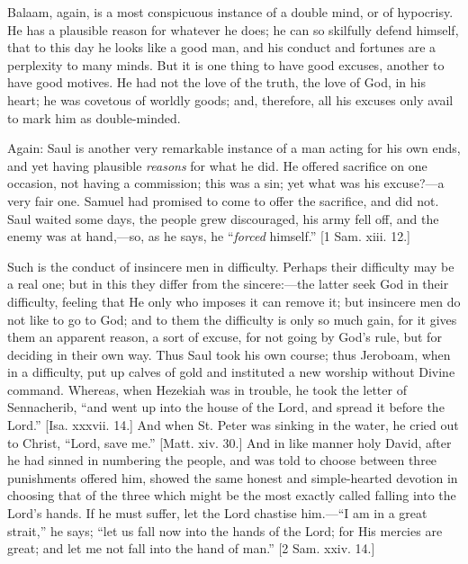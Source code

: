 Balaam, again, is a most conspicuous instance of a double mind, or
of hypocrisy. He has a plausible reason for whatever he does; he can
so skilfully defend himself, that to this day he looks like a good
man, and his conduct and fortunes are a perplexity to many minds. But
it is one thing to have good excuses, another to have good motives. He
had not the love of the truth, the love of God, in his heart; he was
covetous of worldly goods; and, therefore, all his excuses only avail
to mark him as double-minded.

Again: Saul is another very remarkable instance of a man acting for
his own ends, and yet having plausible \emph{reasons} for what he did.
He offered sacrifice on one occasion, not having a commission; this
was a sin; yet what was his excuse?—a very fair one. Samuel had
promised to come to offer the sacrifice, and did not. Saul waited some
days, the people grew discouraged, his army fell off, and the enemy
was at hand,—so, as he says, he ``\emph{forced} himself.''
[1 Sam. xiii. 12.]

Such is the conduct of insincere men in difficulty. Perhaps their
difficulty may be a real one; but in this they differ from the
sincere:—the latter seek God in their difficulty, feeling that He
only who imposes it can remove it; but insincere men do not like to go
to God; and to them the difficulty is only so much gain, for it gives
them an apparent reason, a sort of excuse, for not going by God's
rule, but for deciding in their own way. Thus Saul took his own
course; thus Jeroboam, when in a difficulty, put up calves of gold and
instituted a new worship without Divine command. Whereas, when
Hezekiah was in trouble, he took the letter of Sennacherib, ``and
went up into the house of the Lord, and spread it before the
Lord.'' [Isa. xxxvii. 14.] And when St. Peter was sinking in the
water, he cried out to Christ, ``Lord, save me.'' [Matt. xiv.
30.] And in like manner holy David, after he had sinned in numbering
the people, and was told to choose between three punishments offered
him, showed the same honest and simple-hearted devotion in choosing
that of the three which might be the most exactly called falling into
the Lord's hands. If he must suffer, let the Lord chastise him.—``I
am in a great strait,'' he says; ``let us fall now into the
hands of the Lord; for His mercies are great; and let me not fall into
the hand of man.'' [2 Sam. xxiv. 14.]

